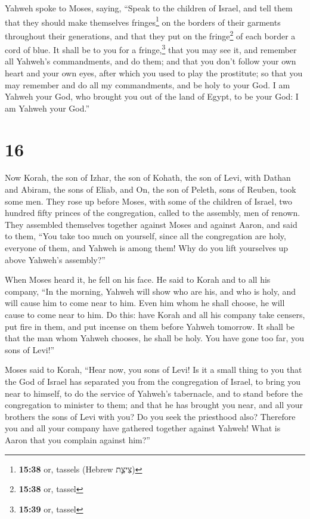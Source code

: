  Yahweh spoke to Moses, saying,  ``Speak
to the children of Israel, and tell them that they should make
themselves fringes\footnote{\textbf{15:38} or, tassels (Hebrew צִיצִ֛ת)}
on the borders of their garments throughout their generations, and that
they put on the fringe\footnote{\textbf{15:38} or, tassel} of each
border a cord of blue.  It shall be to you for a
fringe,\footnote{\textbf{15:39} or, tassel} that you may see it, and
remember all Yahweh's commandments, and do them; and that you don't
follow your own heart and your own eyes, after which you used to play
the prostitute;  so that you may remember and do all my
commandments, and be holy to your God.  I am Yahweh your
God, who brought you out of the land of Egypt, to be your God: I am
Yahweh your God.''

\hypertarget{section-15}{%
\section{16}\label{section-15}}

 Now Korah, the son of Izhar, the son of Kohath, the son
of Levi, with Dathan and Abiram, the sons of Eliab, and On, the son of
Peleth, sons of Reuben, took some men.  They rose up
before Moses, with some of the children of Israel, two hundred fifty
princes of the congregation, called to the assembly, men of renown.
 They assembled themselves together against Moses and
against Aaron, and said to them, ``You take too much on yourself, since
all the congregation are holy, everyone of them, and Yahweh is among
them! Why do you lift yourselves up above Yahweh's assembly?''

 When Moses heard it, he fell on his face. 
He said to Korah and to all his company, ``In the morning, Yahweh will
show who are his, and who is holy, and will cause him to come near to
him. Even him whom he shall choose, he will cause to come near to him.
 Do this: have Korah and all his company take censers,
 put fire in them, and put incense on them before Yahweh
tomorrow. It shall be that the man whom Yahweh chooses, he shall be
holy. You have gone too far, you sons of Levi!''

 Moses said to Korah, ``Hear now, you sons of Levi!
 Is it a small thing to you that the God of Israel has
separated you from the congregation of Israel, to bring you near to
himself, to do the service of Yahweh's tabernacle, and to stand before
the congregation to minister to them;  and that he has
brought you near, and all your brothers the sons of Levi with you? Do
you seek the priesthood also?  Therefore you and all your
company have gathered together against Yahweh! What is Aaron that you
complain against him?''

